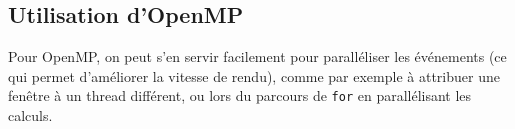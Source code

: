 \documentclass[a4paper,11pt]{report}
\begin{document}
	\subsection{Utilisation d'OpenMP}
	Pour OpenMP, on peut s'en servir facilement pour paralléliser les événements (ce qui permet d'améliorer la vitesse de rendu), comme par exemple à attribuer une fenêtre à un thread différent, ou lors du parcours de \texttt{for} en parallélisant les calculs.
		
	
\end{document}
